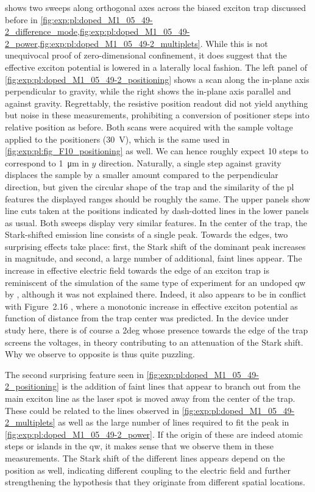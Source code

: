  shows two sweeps along orthogonal axes across the biased exciton trap discussed before in \cref{fig:exp:pl:doped_M1_05_49-2_difference_mode,fig:exp:pl:doped_M1_05_49-2_power,fig:exp:pl:doped_M1_05_49-2_multiplets}.
While this is not unequivocal proof of zero-dimensional confinement, it does suggest that the effective exciton potential is lowered in a laterally local fashion. %
The left panel of \cref{fig:exp:pl:doped_M1_05_49-2_positioning} shows a scan along the in-plane axis perpendicular to gravity, while the right shows the in-plane axis parallel and against gravity.
Regrettably, the resistive position readout did not yield anything but noise in these measurements, prohibiting a conversion of positioner steps into relative position as before.
Both scans were acquired with the sample voltage applied to the positioners (\qty{30}{\volt}), which is the same used in \cref{fig:exp:pl:fig_F10_positioning} as well.
We can hence roughly expect \num{10} steps to correspond to \qty{1}{\micro\meter} in $y$ direction.
Naturally, a single step against gravity displaces the sample by a smaller amount compared to the perpendicular direction, but given the circular shape of the trap and the similarity of the \gls{pl} features the displayed ranges should be roughly the same.
The upper panels show line cuts taken at the positions indicated by dash-dotted lines in the lower panels as usual.
Both sweeps display very similar features.
In the center of the trap, the Stark-shifted emission line consists of a single peak.
Towards the edges, two surprising effects take place: first, the Stark shift of the dominant peak increases in magnitude, and second, a large number of additional, faint lines appear.
The increase in effective electric field towards the edge of an exciton trap is reminiscent of the simulation of the same type of experiment for an undoped \gls{qw} by \citet[Figure~6.4]{Descamps2021}, although it was not explained there.
Indeed, it also appears to be in conflict with Figure~2.16 \ibid, where a monotonic increase in effective exciton potential as function of distance from the trap center was predicted.
In the device under study here, there is of course a \gls{2deg} whose presence towards the edge of the trap screens the voltages, in theory contributing to an attenuation of the Stark shift.
Why we observe to opposite is thus quite puzzling.

The second surprising feature seen in \cref{fig:exp:pl:doped_M1_05_49-2_positioning} is the addition of faint lines that appear to branch out from the main exciton line as the laser spot is moved away from the center of the trap.
These could be related to the lines observed in \cref{fig:exp:pl:doped_M1_05_49-2_multiplets} as well as the large number of lines required to fit the peak in \cref{fig:exp:pl:doped_M1_05_49-2_power}.
If the origin of these are indeed atomic steps or islands in the \gls{qw}, it makes sense that we observe them in these measurements.
The Stark shift of the different lines appears depend on the position as well, indicating different coupling to the electric field and further strengthening the hypothesis that they originate from different spatial locations.

